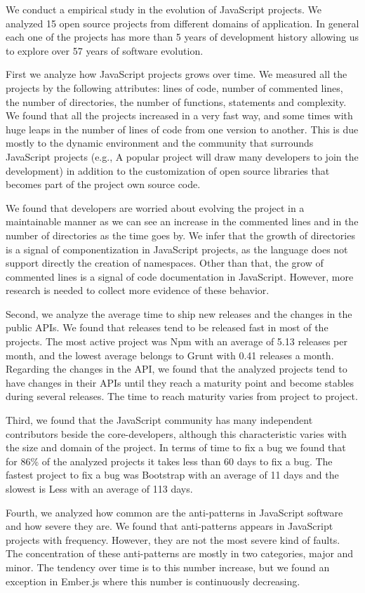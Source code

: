 We conduct a empirical study in the evolution of JavaScript projects. We analyzed 15 open source projects from different domains of application. In general each one of the projects has more than 5 years of development history allowing us to explore over 57 years of software evolution.

First we analyze how JavaScript projects grows over time. We measured all the projects by the following attributes: lines of code, number of commented lines, the number of directories, the number of functions, statements and complexity. We found that all the projects increased in a very fast way, and some times with huge leaps in the number of lines of code from one version to another. This is due mostly to the dynamic environment and the community that surrounds JavaScript projects (e.g., A popular project will draw many developers to join the development) in addition to the customization  of open source libraries that becomes part of the project own source code. 

We found that developers are worried about evolving the project in a maintainable manner as we can see an increase in the commented lines and in the number of directories as the time goes by. We infer that the growth of directories is a signal of componentization in JavaScript projects, as the language does not support directly the creation of namespaces. Other than that, the grow of commented lines is a signal of code documentation in JavaScript. However, more research is needed to collect more evidence of these behavior.

Second, we analyze the average time to ship new releases and the changes in the public APIs. We found that releases tend to be released fast in most of the projects. The most active project was Npm with an average of 5.13 releases per month, and the lowest average belongs to Grunt with 0.41 releases a month. Regarding the changes in the API, we found that the analyzed projects tend to have changes in their APIs until they reach a maturity point and become stables during several releases. The time to reach maturity varies from project to project.

Third, we found that the JavaScript community has many independent contributors beside the core-developers, although this characteristic varies with the size and domain of the project. In terms of time to fix a bug we found that for 86\% of the analyzed projects it takes less than 60 days to fix a bug. The fastest project to fix a bug was Bootstrap with an average of 11 days and the slowest is Less with an average of 113 days.  

Fourth, we analyzed how common are the anti-patterns in JavaScript software and how severe they are. We found that anti-patterns appears in JavaScript projects with frequency. However, they are not the most severe kind of faults. The concentration of these anti-patterns are mostly in two categories, major and minor. The tendency over time is to this number increase, but we found an exception in Ember.js where this number is continuously decreasing.   